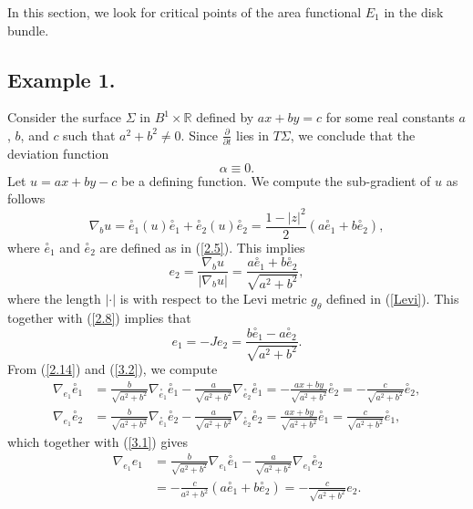 \documentclass{amsart}
\theoremstyle{Corollary}
\numberwithin{equation}{section}
\begin{document}
In this section, we look for  critical points of 
the area functional $E_1$ in the disk bundle. 

\subsection{Example 1.} 

Consider the surface $\Sigma$ in $B^1\times\mathbb{R}$ 
defined by $ax+by=c$ for some real constants $a$, $b$, and $c$
such that $a^2+b^2\neq 0$. 
Since $\frac{\partial}{\partial t}$ lies in $T\Sigma$, 
we conclude that the deviation function 
\begin{equation}\label{3.0}
\alpha\equiv 0.
\end{equation}
Let $u=ax+by-c$ be a defining function. We compute
the sub-gradient of $u$ as follows 
$$\nabla_b u
=\overset{\circ}{e}_1(u) \overset{\circ}{e}_1+\overset{\circ}{e}_2(u) \overset{\circ}{e}_2
=\frac{1-|z|^2}{2}(a\overset{\circ}{e}_1+b\overset{\circ}{e}_2),$$
where $\overset{\circ}{e}_1$ and $\overset{\circ}{e}_2$ are defined as in (\ref{2.5}). 
This implies 
\begin{equation}\label{3.1}
e_2=\frac{\nabla_bu}{|\nabla_b u|}=\frac{a\overset{\circ}{e}_1+b\overset{\circ}{e}_2}{\sqrt{a^2+b^2}},
\end{equation}
where the length $|\cdot|$ is with respect to the Levi metric $g_\theta$ defined in (\ref{Levi}). 
This together with (\ref{2.8}) implies that 
\begin{equation}\label{3.2}
e_1=-Je_2=\frac{b\overset{\circ}{e}_1-a\overset{\circ}{e}_2}{\sqrt{a^2+b^2}}. 
\end{equation}
From (\ref{2.14}) and (\ref{3.2}), 
we compute 
\begin{equation*}
\begin{split}
\nabla_{e_1}\overset{\circ}{e}_1&=\frac{b}{\sqrt{a^2+b^2}}\nabla_{\overset{\circ}{e}_1}\overset{\circ}{e}_1
-\frac{a}{\sqrt{a^2+b^2}}\nabla_{\overset{\circ}{e}_2}\overset{\circ}{e}_1
=-\frac{ax+by}{\sqrt{a^2+b^2}}\overset{\circ}{e}_2=-\frac{c}{\sqrt{a^2+b^2}}\overset{\circ}{e}_2,\\
\nabla_{e_1}\overset{\circ}{e}_2&=\frac{b}{\sqrt{a^2+b^2}}\nabla_{\overset{\circ}{e}_1}\overset{\circ}{e}_2
-\frac{a}{\sqrt{a^2+b^2}}\nabla_{\overset{\circ}{e}_2}\overset{\circ}{e}_2
=\frac{ax+by}{\sqrt{a^2+b^2}}\overset{\circ}{e}_1=\frac{c}{\sqrt{a^2+b^2}}\overset{\circ}{e}_1,
\end{split}
\end{equation*}
which together with (\ref{3.1}) gives 
\begin{equation*}
\begin{split}
\nabla_{e_1}e_1
&=\frac{b}{\sqrt{a^2+b^2}}\nabla_{e_1}\overset{\circ}{e}_1
-\frac{a}{\sqrt{a^2+b^2}}\nabla_{e_1}\overset{\circ}{e}_2\\
&=-\frac{c}{a^2+b^2}(a\overset{\circ}{e}_1+b\overset{\circ}{e}_2)
=-\frac{c}{\sqrt{a^2+b^2}}e_2.
\end{split}
\end{equation*}
\end{document}
